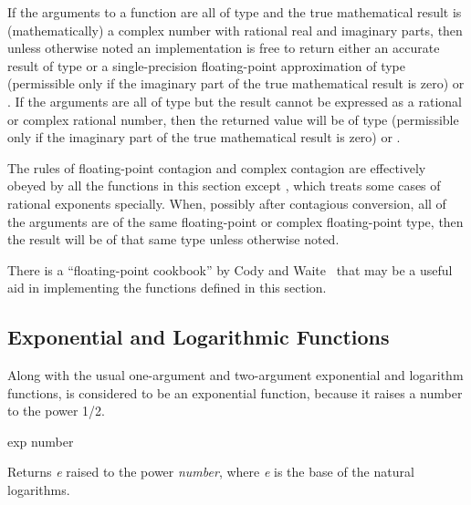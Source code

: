 If the arguments to a function are all of type
 and the true mathematical result
is (mathematically) a complex number with rational real
and imaginary parts, then unless otherwise noted
an implementation is free to return either an accurate result of
type 
or a single-precision floating-point approximation
of type  (permissible only if the imaginary part
of the true mathematical result is zero) or .
If the arguments are all of type
 but the result cannot be expressed
as a rational or complex rational number, then the returned value
will be of type  (permissible only if the imaginary part
of the true mathematical result is zero) or .

The rules of floating-point contagion and complex contagion are 
effectively obeyed by all the functions in this section except ,
which treats some cases of rational exponents specially.
When, possibly after contagious conversion, all of the arguments are of
the same floating-point or complex floating-point type,
then the result will be of that same type unless otherwise noted.

\beforenoterule
\begin{implementation}
There is a ``floating-point cookbook'' by
Cody and Waite~\cite{CODY-AND-WAITE} that may be a useful aid
in implementing the functions defined in this section.
\end{implementation}
\afternoterule

\subsection{Exponential and Logarithmic Functions}

Along with the usual one-argument and two-argument exponential and
logarithm functions,  is considered to be an exponential
function, because it raises a number to the power 1/2.

\begin{defun}[Function]
exp number

Returns \emph{e} raised to the power \emph{number},
where \emph{e} is the base of the natural logarithms.
\end{defun}

